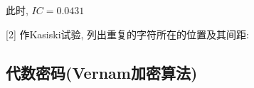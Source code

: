 \documentclass[UTF8]{ctexart}
\begin{document}
\begin{itemize}
\begin{enumerate}
\begin{itemize}
\begin{itemize}
\begin{itemize}
                            此时, $IC=0.0431$

                            [2] 作Kasiski试验, 列出重复的字符所在的位置及其间距:

                    \end{itemize}

                \end{itemize}
            \end{itemize}

        \end{enumerate}

    \end{itemize}

    \subsection{代数密码(Vernam加密算法)}
\end{document}

